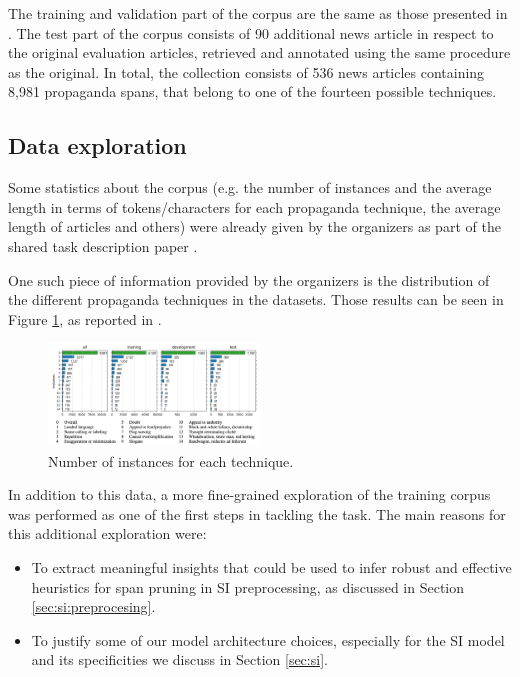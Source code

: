 \documentclass[11pt]{article}
\newcommand{\pol}[1]{{\fontfamily{pcr}\selectfont#1}}
\begin{document}
The training and validation part of the corpus are the same as those presented in \cite{da-san-martino-etal-2019-fine}. The test part of the corpus consists of 90 additional news article in respect to the original evaluation articles, retrieved and annotated using the same procedure as the original. In total, the collection consists of 536 news articles containing 8,981 propaganda spans, that belong to one of the fourteen possible techniques.

\subsection{Data exploration}
Some statistics about the corpus (e.g. the number of instances and the average length in terms of tokens/characters for each propaganda technique, the average length of articles and others) were already given by the organizers as part of the shared task description paper \cite{semeval}.

One such piece of information provided by the organizers is the distribution of the different propaganda techniques in the datasets. Those results can be seen in Figure \ref{fig:tech_distr}, as reported in \cite{semeval}.

\begin{figure}[h]
    \centering
    \includegraphics[width=0.5\textwidth]{images/technique_distr.png}
    \caption{Number of instances for each technique.}
    \label{fig:tech_distr}
\end{figure}

In addition to this data, a more fine-grained exploration of the training corpus was performed as one of the first steps in tackling the task. The main reasons for this additional exploration were:
\begin{itemize}
    \item To extract meaningful insights that could be used to infer robust and effective heuristics for span pruning in \pol{SI} preprocessing, as discussed in Section \ref{sec:si:preprocesing}.
    \item To justify some of our model architecture choices, especially for the \pol{SI} model and its specificities we discuss in Section \ref{sec:si}.
\end{itemize}
\end{document}
